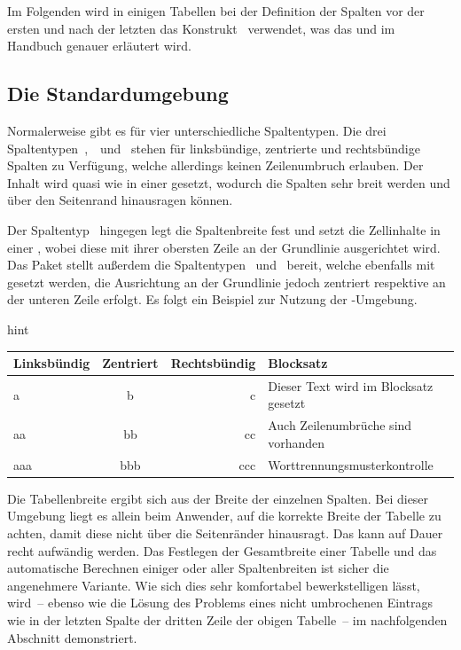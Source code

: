 \documentclass[%
  english,ngerman,%
  cdgeometry=no,DIV=12,%
  cd=false,cdfont=false,cdtitle=true,%
  headings=normal,%
  automark,%
  listof=toc,%
]{tudscrartcl}
\makeatletter
\newcommand*\pcolumnfuzz[1]{\pretocmd\@endpbox{\hfuzz=#1}{}{}}
\makeatother
\begin{document}
Im Folgenden wird in einigen Tabellen bei der Definition der Spalten vor der 
ersten und nach der letzten das Konstrukt~ verwendet, 
was das  
und im Handbuch genauer erläutert wird. 



\subsection{Die Standardumgebung }

Normalerweise gibt es für  vier unterschiedliche 
Spaltentypen. Die drei Spaltentypen~,~~und~ 
stehen für linksbündige, zentrierte und rechtsbündige Spalten zu Verfügung, 
welche allerdings keinen Zeilenumbruch erlauben. Der Inhalt wird quasi wie in 
einer  gesetzt, wodurch die Spalten sehr breit werden und über den 
Seitenrand hinausragen können.

Der Spaltentyp~ hingegen legt die Spaltenbreite 
fest und setzt die Zellinhalte in einer , wobei diese mit ihrer 
obersten Zeile an der Grundlinie ausgerichtet wird. Das Paket  
stellt außerdem die Spaltentypen~ 
und~ bereit, welche ebenfalls mit  
gesetzt werden, die Ausrichtung an der Grundlinie jedoch zentriert respektive 
an der unteren Zeile erfolgt. Es folgt ein Beispiel zur Nutzung der 
-Umgebung.
%
\begingroup
\pcolumnfuzz{70pt}
\begin{Code}[input]{hint}
\begin{tabular}[b]{lcrp{33mm}}
\toprule
\textbf{Linksbündig} & \textbf{Zentriert} & 
\textbf{Rechtsbündig} & \textbf{Blocksatz} \tabularnewline\midrule
a   & b   & c   & Dieser Text wird im Blocksatz gesetzt\tabularnewline
aa  & bb  & cc  & Auch Zeilenumbrüche sind vorhanden\tabularnewline
aaa & bbb & ccc & Worttrennungsmusterkontrolle\tabularnewline
\bottomrule
\end{tabular}
\end{Code}
\endgroup

Die Tabellenbreite ergibt sich aus der Breite der einzelnen Spalten. Bei dieser 
Umgebung liegt es allein beim Anwender, auf die korrekte Breite der Tabelle zu 
achten, damit diese nicht über die Seitenränder hinausragt. Das kann auf Dauer 
recht aufwändig werden. Das Festlegen der Gesamtbreite einer Tabelle und das 
automatische Berechnen einiger oder aller Spaltenbreiten ist sicher die 
angenehmere Variante. Wie sich dies sehr komfortabel bewerkstelligen lässt, 
wird~-- ebenso wie die Lösung des Problems eines nicht umbrochenen Eintrags wie
in der letzten Spalte der dritten Zeile der obigen Tabelle~-- im nachfolgenden
Abschnitt demonstriert.
\end{document}
